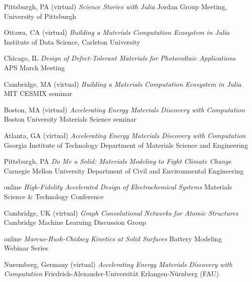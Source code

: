 	{Pittsburgh, PA (virtual)}
	{\textit{Science Stories with Julia}}
    {Jordan Group Meeting, University of Pittsburgh}

\vspace{-2mm}
\datedsubsection{}
	{Ottawa, CA (virtual)}
	{\textit{Building a Materials Computation Ecosystem in Julia}}
    {Institute of Data Science, Carleton University}

\vspace{-2mm}
\datedsubsection{}
    {Chicago, IL}
    {\textit{Design of Defect-Tolerant Materials for Photovoltaic Applications}}
    {APS March Meeting}

\vspace{-2mm}
\datedsubsection{}
    {Cambridge, MA (virtual)}
    {\textit{Building a Materials Computation Ecosystem in Julia}}
    {MIT CESMIX seminar}

\vspace{-2mm}
\datedsubsection{}
    {Boston, MA (virtual)}
    {\textit{Accelerating Energy Materials Discovery with Computation}}
    {Boston University Materials Science seminar}

\vspace{-2mm}
    {Atlanta, GA (virtual)}
    {\textit{Accelerating Energy Materials Discovery with Computation}}
    {Georgia Institute of Technology Department of Materials Science and Engineering}

\vspace{-2mm}
\datedsubsection{}
    {Pittsburgh, PA}
    {\textit{Do Me a Solid: Materials Modeling to Fight Climate Change}}
    {Carnegie Mellon University Department of Civil and Environmental Engineering}

\vspace{-2mm}
    {online}
    {\textit{High-Fidelity Accelerated Design of Electrochemical Systems}}
    {Materials Science \& Technology Conference}

\vspace{-2mm}
\datedsubsection{}
    {Cambridge, UK (virtual)}
    {\textit{Graph Convolutional Networks for Atomic Structures}}
    {Cambridge Machine Learning Discussion Group}

\vspace{-2mm}
\datedsubsection{}
    {online}
    {\textit{Marcus-Hush-Chidsey Kinetics at Solid Surfaces}}
    {Battery Modeling Webinar Series}

\vspace{-2mm}
\datedsubsection{}
    {Nuremberg, Germany (virtual)}
    {\textit{Accelerating Energy Materials Discovery with Computation}}
    {Friedrich-Alexander-Universit\"at Erlangen-N\"urnberg (FAU)}


